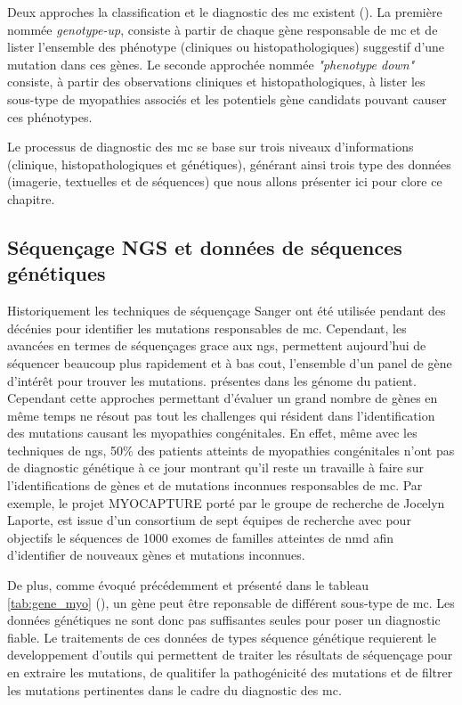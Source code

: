 Deux approches la classification et le diagnostic des \gls{mc} existent (\cite{north_approach_2014}). La première nommée \textit{genotype-up}, consiste à partir de chaque gène responsable de \gls{mc} et de lister l'ensemble des phénotype (cliniques ou histopathologiques) suggestif d'une mutation dans ces gènes. Le seconde approchée nommée \textit{"phenotype down"} consiste, à partir des observations cliniques et histopathologiques, à lister les sous-type de myopathies associés et les potentiels gène candidats pouvant causer ces phénotypes.

Le processus de diagnostic des \gls{mc} se base sur trois niveaux d'informations (clinique, histopathologiques et génétiques), générant ainsi trois type des données (imagerie, textuelles et de séquences) que nous allons présenter ici pour clore ce chapitre.

\subsection{Séquençage NGS et données de séquences génétiques}
Historiquement les techniques de séquençage Sanger ont été utilisée pendant des décénies pour identifier les mutations responsables de \gls{mc}. Cependant, les avancées en termes de séquençages grace aux \gls{ngs}, permettent aujourd'hui de séquencer beaucoup plus rapidement et à bas cout, l'ensemble d'un panel de gène d'intérêt pour trouver les mutations. présentes dans les génome du patient. Cependant cette approches permettant d'évaluer un grand nombre de gènes en même temps ne résout pas tout les challenges qui résident dans l'identification des mutations causant les myopathies congénitales. En effet, même avec les techniques de \gls{ngs}, 50\% des patients atteints de myopathies congénitales n'ont pas de diagnostic génétique à ce jour montrant qu'il reste un travaille à faire sur l'identifications de gènes et de mutations inconnues responsables de \gls{mc}. Par exemple, le projet MYOCAPTURE porté par le groupe de recherche de Jocelyn Laporte, est issue d'un consortium de sept équipes de recherche avec pour objectifs le séquences de 1000 exomes de familles atteintes de \gls{nmd} afin d'identifier de nouveaux gènes et mutations inconnues.

De plus, comme évoqué précédemment et présenté dans le tableau \ref{tab:gene_myo} (\cite{cassandrini_congenital_2017}), un gène peut être reponsable de différent sous-type de \gls{mc}. Les données génétiques ne sont donc pas suffisantes seules pour poser un diagnostic fiable. Le traitements de ces données de types séquence génétique requierent le developpement d'outils qui permettent de traiter les résultats de séquençage pour en extraire les mutations, de qualitifer la pathogénicité des mutations et de filtrer les mutations pertinentes dans le cadre du diagnostic des \gls{mc}. 

